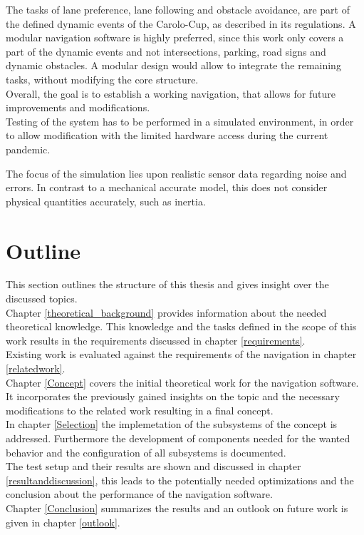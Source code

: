 The tasks of lane preference, lane following and obstacle avoidance, are part of the defined dynamic events of the Carolo-Cup, as described in its regulations\cite{carolocup}. A modular navigation software is highly preferred, since this work only covers a part of the dynamic events and not intersections, parking, road signs and dynamic obstacles. A modular design would allow to integrate the remaining tasks, without modifying the core structure.\\

Overall, the goal is to establish a working navigation, that allows for future improvements and modifications.\\

Testing of the system has to be performed in a simulated environment, in order to allow modification with the limited hardware access during the current pandemic.

The focus of the simulation lies upon realistic sensor data regarding noise and errors. In contrast to a mechanical accurate model, this does not consider physical quantities accurately, such as inertia.


\section{Outline}
This section outlines the structure of this thesis and gives insight over the discussed topics.\\

Chapter \ref{theoretical_background} provides information about the needed theoretical knowledge. This knowledge and the tasks defined in the scope of this work results in the requirements discussed in chapter \ref{requirements}.\\

Existing work is evaluated against the requirements of the navigation in chapter \ref{relatedwork}.\\

Chapter \ref{Concept} covers the initial theoretical work for the navigation software. It incorporates the previously gained insights on the topic and the necessary modifications to the related work resulting in a final concept.\\

In chapter \ref{Selection} the implemetation of the subsystems of the concept is addressed. Furthermore the development of components needed for the wanted behavior and the configuration of all subsystems is documented.\\

The test setup and their results are shown and discussed in chapter \ref{resultanddiscussion}, this leads to the potentially needed optimizations and the conclusion about the performance of the navigation software.\\

Chapter \ref{Conclusion} summarizes the results and an outlook on future work is given in chapter \ref{outlook}.
